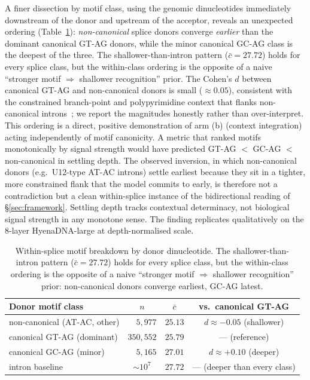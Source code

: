 \documentclass{article}
\theoremstyle{plain}
\theoremstyle{definition}
\theoremstyle{remark}
\begin{document}
A finer dissection by motif class, using the genomic dinucleotides immediately downstream of the donor and upstream of the acceptor, reveals an unexpected ordering (Table~\ref{tab:splice-canonical}): \emph{non-canonical} splice donors converge \emph{earlier} than the dominant canonical GT-AG donors, while the minor canonical GC-AG class is the deepest of the three. The shallower-than-intron pattern
($\bar c\!=\!27.72$) holds for every splice class, but the within-class
ordering is the opposite of a naive ``stronger motif $\Rightarrow$
shallower recognition'' prior. The Cohen's $d$ between canonical GT-AG
and non-canonical donors is small ($\approx 0.05$), consistent with the
constrained branch-point and polypyrimidine context that flanks
non-canonical introns~\cite{wang2008splicecode,burge1998u12}; we
report the magnitudes honestly rather than over-interpret.
This ordering is a direct, positive
demonstration of arm (b) (context integration) acting independently of
motif canonicity. A metric that ranked motifs monotonically by signal strength would have predicted GT-AG $<$ GC-AG $<$ non-canonical in settling depth. The observed inversion, in which non-canonical donors (e.g.\ U12-type AT-AC introns) settle earliest because they sit in a tighter, more constrained flank that the model commits to early, is therefore not a contradiction but a clean within-splice instance of the bidirectional reading of \S\ref{sec:framework}. Settling depth tracks
contextual determinacy, not biological signal strength in any monotone
sense. The finding replicates qualitatively on the 8-layer HyenaDNA-large
at depth-normalised scale.

\begin{table}[!htbp]
  \caption{Within-splice motif breakdown by donor dinucleotide. The
    shallower-than-intron pattern ($\bar c\!=\!27.72$) holds for every
    splice class, but the within-class ordering is the opposite of a naive
    ``stronger motif $\Rightarrow$ shallower recognition'' prior:
  non-canonical donors converge earliest, GC-AG latest.}
  \label{tab:splice-canonical}
  \centering
  \small
  \begin{tabular}{@{}lccc@{}}
    \toprule
    Donor motif class & $n$ & $\bar c$ & vs.\ canonical GT-AG \\
    \midrule
    non-canonical (AT-AC, other) & $\phantom{00}5{,}977$ & $25.13$ & $d\approx -0.05$ (shallower) \\
    canonical GT-AG (dominant)   & $350{,}552$ & $25.79$ & --- (reference) \\
    canonical GC-AG (minor)      & $\phantom{00}5{,}165$ & $27.01$ & $d\approx +0.10$ (deeper) \\
    \midrule
    intron baseline              & $\sim\!10^7$           & $27.72$ & --- (deeper than every class) \\
    \bottomrule
  \end{tabular}
\end{table}
\end{document}
